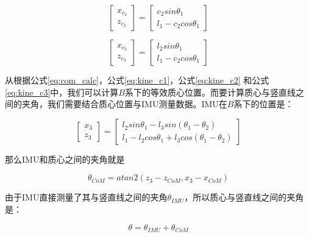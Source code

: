 \begin{equation}
    \begin{bmatrix}
        x_{c_2} \\
        z_{c_2}
    \end{bmatrix}
    =
    \begin{bmatrix}
        c_2 sin\theta_1 \\
        l_1 - c_2 cos\theta_1
    \end{bmatrix}
    \label{eq:kine_c2}
\end{equation}

\begin{equation}
    \begin{bmatrix}
        x_{c_3} \\
        z_{c_3}
    \end{bmatrix}
    =
    \begin{bmatrix}
        l_2 sin\theta_1 \\
        l_1 - c_2 cos\theta_1
    \end{bmatrix}
    \label{eq:kine_c3}
\end{equation}

从根据公式\ref{eq:com_calc}，公式\ref{eq:kine_c1}，公式\ref{eq:kine_c2} 和公式\ref{eq:kine_c3}中，我们可以计算${B}$系下的等效质心位置。而要计算质心与竖直线之间的夹角，我们需要结合质心位置与IMU测量数据。IMU在${B}$系下的位置是：

\begin{equation}
    \begin{bmatrix}
        x_3 \\
        z_3
    \end{bmatrix}
    =
    \begin{bmatrix}
        l_2 sin\theta_1 - l_3 sin(\theta_1 - \theta_2) \\
        l_1 - l_2 cos\theta_1 + l_3 cos(\theta_1 - \theta_2)
    \end{bmatrix}
    \label{eq:kine_3}
\end{equation}

那么IMU和质心之间的夹角就是

\begin{equation}
    \theta_{CoM} = atan2(z_3 - z_{CoM}, x_3-x_{CoM})
    \label{eq:theta_com}
\end{equation}

由于IMU直接测量了其与竖直线之间的夹角$\theta_{IMU}$，所以质心与竖直线之间的夹角是：

\begin{equation}
    \theta = \theta_{IMU} + \theta_{CoM}
    \label{eq:theta_calc}
\end{equation}

